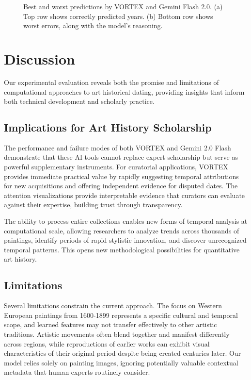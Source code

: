 \documentclass[10pt,twocolumn,letterpaper]{article}
\begin{document}
\begin{figure}[t]


\caption{Best and worst predictions by VORTEX and Gemini Flash 2.0. (a) Top row shows correctly predicted years. (b) Bottom row shows worst errors, along with the model's reasoning.}
\label{fig:predictions}
\end{figure}


\section{Discussion}

Our experimental evaluation reveals both the promise and limitations of computational approaches to art historical dating, providing insights that inform both technical development and scholarly practice.

\subsection{Implications for Art History Scholarship}

The performance and failure modes of both VORTEX and Gemini 2.0 Flash demonstrate that these AI tools cannot replace expert scholarship but serve as powerful supplementary instruments. For curatorial applications, VORTEX provides immediate practical value by rapidly suggesting temporal attributions for new acquisitions and offering independent evidence for disputed dates. The attention visualizations provide interpretable evidence that curators can evaluate against their expertise, building trust through transparency.

The ability to process entire collections enables new forms of temporal analysis at computational scale, allowing researchers to analyze trends across thousands of paintings, identify periods of rapid stylistic innovation, and discover unrecognized temporal patterns. This opens new methodological possibilities for quantitative art history.

\subsection{Limitations}

Several limitations constrain the current approach. The focus on Western European paintings from 1600-1899 represents a specific cultural and temporal scope, and learned features may not transfer effectively to other artistic traditions. Artistic movements often blend together and manifest differently across regions, while reproductions of earlier works can exhibit visual characteristics of their original period despite being created centuries later. Our model relies solely on painting images, ignoring potentially valuable contextual metadata that human experts routinely consider.
\end{document}
